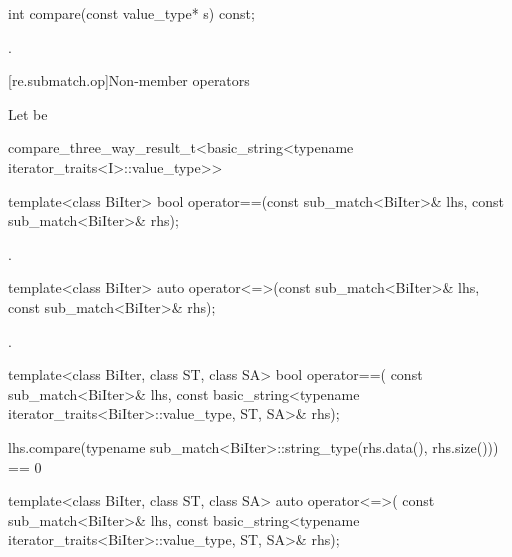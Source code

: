 %
\begin{itemdecl}
int compare(const value_type* s) const;
\end{itemdecl}

\begin{itemdescr}
\pnum
\returns
{}.
\end{itemdescr}

[re.submatch.op]{Non-member operators}

\pnum
Let  be
\begin{codeblock}
compare_three_way_result_t<basic_string<typename iterator_traits<I>::value_type>>
\end{codeblock}

%
\begin{itemdecl}
template<class BiIter>
  bool operator==(const sub_match<BiIter>& lhs, const sub_match<BiIter>& rhs);
\end{itemdecl}

\begin{itemdescr}
\pnum
\returns
{}.
\end{itemdescr}

%
\begin{itemdecl}
template<class BiIter>
  auto operator<=>(const sub_match<BiIter>& lhs, const sub_match<BiIter>& rhs);
\end{itemdecl}

\begin{itemdescr}
\pnum
\returns
{}.
\end{itemdescr}

%
\begin{itemdecl}
template<class BiIter, class ST, class SA>
  bool operator==(
      const sub_match<BiIter>& lhs,
      const basic_string<typename iterator_traits<BiIter>::value_type, ST, SA>& rhs);
\end{itemdecl}

\begin{itemdescr}
\pnum
\returns
\begin{codeblock}
lhs.compare(typename sub_match<BiIter>::string_type(rhs.data(), rhs.size())) == 0
\end{codeblock}
\end{itemdescr}

%
\begin{itemdecl}
template<class BiIter, class ST, class SA>
  auto operator<=>(
      const sub_match<BiIter>& lhs,
      const basic_string<typename iterator_traits<BiIter>::value_type, ST, SA>& rhs);
\end{itemdecl}

